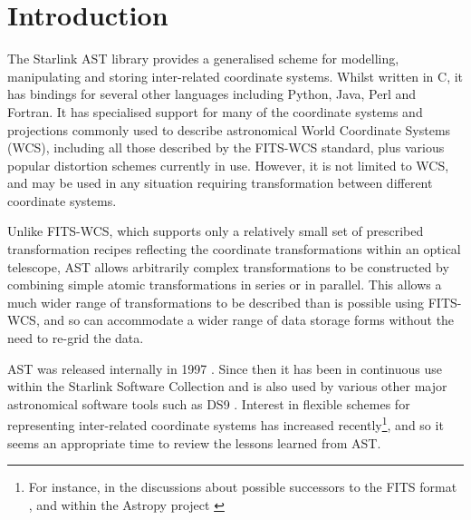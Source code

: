\documentclass[final,authoryear,5p,times,twocolumn]{elsarticle}
\begin{document}

\newcommand{\mnras}{Mon Not R Astron Soc}
\newcommand{\aap}{Astron Astrophys}
\newcommand{\aaps}{Astron Astrophys Supp}
\newcommand{\pasp}{Pub Astron Soc Pacific}
\newcommand{\apj}{Astrophys J}
\newcommand{\apjs}{Astrophys J Supp}
\newcommand{\qjras}{Quart J R Astron Soc}
\newcommand{\an}{Astron.\ Nach.}
\newcommand{\ijimw}{Int.\ J.\ Infrared \& Millimeter Waves}
\newcommand{\procspie}{Proc.\ SPIE}
\newcommand{\aspconf}{ASP Conf. Ser.}

\newcommand{\ascl}[1]{\href{http://www.ascl.net/#1}{ascl:#1}}

\section{Introduction}
\label{sec:intro}

The Starlink AST library \citep[][\ascl{1404.016}]{SUN211} provides a
generalised scheme for modelling, manipulating and storing inter-related
coordinate systems. Whilst written in C, it has bindings for several
other languages including Python, Java, Perl and Fortran. It has
specialised support for many of the coordinate systems and projections
commonly used to describe astronomical World Coordinate Systems (WCS),
including all those described by the FITS-WCS standard, plus various
popular distortion schemes currently in use. However, it is not limited
to WCS, and may be used in any situation requiring transformation between
different coordinate systems.

Unlike FITS-WCS, which supports only a relatively small set of prescribed
transformation recipes reflecting the coordinate transformations within
an optical telescope, AST allows arbitrarily complex transformations to be
constructed by combining simple atomic transformations in series or in
parallel. This allows a much wider range of transformations to be
described than is possible using FITS-WCS, and so can accommodate a wider
range of data storage forms without the need to re-grid the data.

AST was released internally in 1997 \cite[][included in ``Twenty Years of
ADASS'' \nocite{adass20}]{1998ASPC..145...41W}. Since then it has been in
continuous use within the Starlink Software Collection \citep[][\ascl{1110.012}]{2014ASPC..485..391C}
and is also used by various other major astronomical software tools such as
DS9 \citep[][\ascl{0003.002}]{2003ASPC..295..489J}. Interest in flexible schemes for representing
inter-related coordinate systems has increased recently\footnote{For
instance, in the discussions about possible successors to the FITS format \citep{2015Mink},
and within the Astropy project \citep{2013A&A...558A..33A}}, and so it seems an appropriate time to
review the lessons learned from AST.
\end{document}
